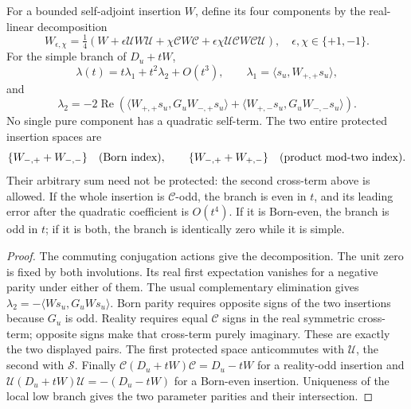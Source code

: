 \documentclass[11pt,a4paper]{article}
\begin{document}
\begin{theorem}
\label{p3f:thm:native-source-joint-selection}
For a bounded self-adjoint insertion \(W\), define its four components
by the real-linear decomposition
\begin{equation}
 W_{\epsilon,\chi}=\tfrac14
   (W+\epsilon\mathcal UW\mathcal U+\chi\mathcal CW\mathcal C
       +\epsilon\chi\mathcal U\mathcal CW\mathcal C\mathcal U),
 \quad \epsilon,\chi\in\{+1,-1\}.
 \label{p3f:eq:native-source-four-components}
\end{equation}
For the simple branch of \(D_u+tW\),
\[
 \lambda(t)=t\lambda_1+t^2\lambda_2+O(t^3),\qquad
 \lambda_1=\langle s_u,W_{+,+}s_u\rangle,
\]
and
\begin{equation}
 \lambda_2=-2\operatorname{Re}
   \left(\langle W_{+,+}s_u,G_uW_{-,+}s_u\rangle
       +\langle W_{+,-}s_u,G_uW_{-,-}s_u\rangle\right).
 \label{p3f:eq:native-source-second-selection}
\end{equation}
No single pure component has a quadratic self-term. The two entire
protected insertion spaces are
\[
 \{W_{-,+}+W_{-,-}\}\quad\hbox{(Born index)},\qquad
 \{W_{-,+}+W_{+,-}\}\quad\hbox{(product mod-two index)}.
\]
Their arbitrary sum need not be protected: the second cross-term
above is allowed. If the whole insertion is \(\mathcal C\)-odd,
the branch is even in \(t\), and its leading error after the quadratic
coefficient is \(O(t^4)\). If it is Born-even, the branch is odd in
\(t\); if it is both, the branch is identically zero while it is simple.
\end{theorem}
\begin{proof}
The commuting conjugation actions give the decomposition. The unit
zero is fixed by both involutions. Its real first expectation vanishes
for a negative parity under either of them. The usual complementary
elimination gives \(\lambda_2=-\langle Ws_u,G_uWs_u\rangle\).
Born parity requires opposite signs of the two insertions because
\(G_u\) is odd. Reality requires equal \(\mathcal C\) signs in the
real symmetric cross-term; opposite signs make that cross-term purely
imaginary. These are exactly the two displayed pairs. The first
protected space anticommutes with \(\mathcal U\), the second with
\(\mathcal S\). Finally
\(\mathcal C(D_u+tW)\mathcal C=D_u-tW\) for a reality-odd
insertion and \(\mathcal U(D_u+tW)\mathcal U=-(D_u-tW)\)
for a Born-even insertion. Uniqueness of the local low branch gives
the two parameter parities and their intersection.
\end{proof}
\end{document}
